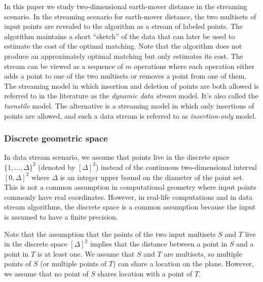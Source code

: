 \documentclass[oribibl]{llncs}
\begin{document}
In this paper we study two-dimensional earth-mover distance in the
streaming scenario.
In the streaming scenario for earth-mover distance, the two multisets of input
points are revealed to the algorithm as a stream of labeled points. The
algorithm maintains a short ``sketch'' of the data that can later be used to 
estimate the cost of the optimal matching. Note that the algorithm
does not produce an approximately optimal matching but only estimates its cost. 
The stream can be viewed as a
sequence of $m$ operations where each operation either adds a point to one of
the two multisets or removes a point from one of them. 
The streaming model in which insertion and deletion of
points are both allowed is referred to in the literature as the \textit{dynamic
data stream} model. It's also called the \textit{turnstile} model.
The alternative is a streaming model in which only insertions of points are
allowed, and such a data stream is referred to as \textit{insertion-only} model.

\subsubsection{Discrete geometric space}
In data stream scenario, we assume that points live in the discrete space
$\{1,\ldots,\Delta\}^2$ (denoted by $[\Delta]^2$) instead of the continuous
two-dimensional interval $[0,\Delta]^2$
where $\Delta$ is an integer upper bound on the diameter of the point set.
This is not a common assumption in computational geometry where input points
commonly have real coordinates. However, in real-life computations and in data
stream algorithms, the discrete space is a common assumption because the input
is assumed to have a finite precision.

Note that the assumption that the points of the two input multisets $S$ and $T$
live in the discrete space $[\Delta]^2$ implies that the distance between 
a point in $S$ and a point in $T$ is at least one. We assume that $S$ and $T$
are multisets, so multiple points of $S$ (or multiple points of $T$)
can share a location on the plane. However, we assume
that no point of $S$ shares location with a point of $T$. 
\end{document}
